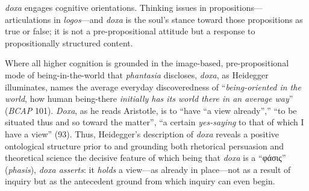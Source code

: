 \documentclass{article}
\newcommand{\gk}[1]{{\greekfont #1}}
\begin{document}
\textit{doxa} engages cognitive orientations. Thinking issues in propositions---articulations in \textit{logos}---and \textit{doxa} is the soul's stance toward those propositions as true or false; it is not a pre-propositional attitude but a response to propositionally structured content.

Where all higher cognition is grounded in the image-based, pre-propositional mode of being-in-the-world that \textit{phantasia} discloses, \textit{doxa}, as Heidegger illuminates, names the average everyday discoveredness of ``\textit{being-oriented in the world}, how human being-there \textit{initially has its world there in an average way}'' (\textit{BCAP} 101). \textit{Doxa}, as he reads Aristotle, is to ``have ``a view already'','' ``to be situated thus and so toward the matter'', ``a certain \textit{yes-saying} to that of which I have a view'' (93). Thus, Heidegger's description of \textit{doxa} reveals a positive ontological structure prior to and grounding both rhetorical persuasion and theoretical science the decisive feature of which being that \textit{doxa} is a ``\gk{φάσις}'' (\textit{phasis}), \textit{doxa asserts}: it \textit{holds} a view---as already in place---not as a result of inquiry but as the antecedent ground from which inquiry can even begin. 
\end{document}
